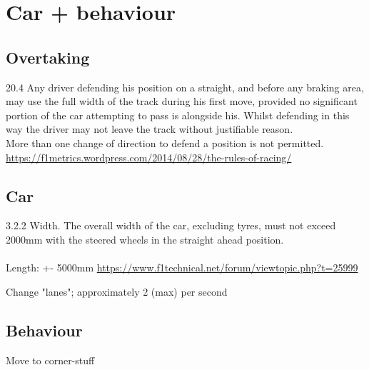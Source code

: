 \documentclass{article}
\begin{document}
\section{Car + behaviour}

\subsection{Overtaking}
20.4 Any driver defending his position on a straight, and before any braking area, may use the full width of the track during his first move, provided no significant portion of the car attempting to pass is alongside his. Whilst defending in this way the driver may not leave the track without justifiable reason.\\

 More than one change of direction to defend a position is not permitted.\\
\noindent
\url{https://f1metrics.wordpress.com/2014/08/28/the-rules-of-racing/}

\subsection{Car}
3.2.2 Width. The overall width of the car, excluding tyres, must not exceed 2000mm with the steered wheels in the straight ahead position.\\
\noindent
\href{3.\_formula\_one\_-\_technical\_regulations\_-\_2017.pdf}\\

\noindent
Length: +- 5000mm \url{https://www.f1technical.net/forum/viewtopic.php?t=25999}

Change "lanes"; approximately 2 (max) per second

\subsection{Behaviour}
Move to corner-stuff
\end{document}
